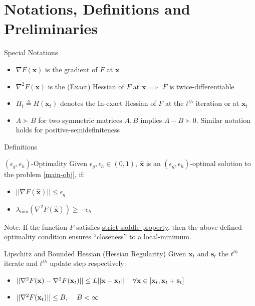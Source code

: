 \documentclass[10pt]{beamer}
\newcommand{\h}{\nabla^{2}}
\newcommand{\g}{\nabla}
\newcommand{\xbold}{\mathbf{x}}
\newcommand{\sbold}{\mathbf{s}}
\newcommand{\mineig}{\lambda_{\min}}
\begin{document}
\section{Notations, Definitions and Preliminaries}
\begin{frame}{Special Notations}
\begin{itemize}
\item<1->{\(\g F(\xbold)\) is the gradient of \(F\) at \(\xbold\)}
\item<2->{\(\h F(\xbold)\) is the (Exact) Hessian of \(F\) at \(\xbold \implies\) \(F\) is twice-differentiable}
\item<3->{\(H_{t} \triangleq H(\xbold_{t})\) denotes the In-exact Hessian of \(F\) at the \(t^{th}\) iteration or at \(\xbold_{t}\)}
\item<4->{\(A \succ B\) for two symmetric matrices \(A, B\) implies \(A - B \succ 0\). Similar notation holds for positive-semidefiniteness}
\end{itemize}
\end{frame}

\begin{frame}{Definitions}
\begin{alertblock}{\((\epsilon_{g}, \epsilon_{h})\)-Optimality}
\label{sec-opt}
Given \(\epsilon_{g}, \epsilon_{h} \in (0, 1)\), \(\mathbf{\hat{x}}\) is an \((\epsilon_{g}, \epsilon_{h})\)-optimal solution to the problem \ref{main-obj}, if:
\begin{itemize}
\item \(||\g F(\mathbf{\hat{x}}) || \leq \epsilon_{g}\)
\item \(\mineig (\h F(\mathbf{\hat{x}})) \geq -\epsilon_{h}\)
\end{itemize}
\end{alertblock}
\pause
Note: If the function \(F\) satisfies \underline{strict saddle property}, then the above defined optimality condition ensures ``closeness'' to a local-minimum. %
\pause
\begin{alertblock}{Lipschitz and Bounded Hessian (Hessian Regularity)}
Given \(\xbold_{t}\) and \(\sbold_{t}\) the \(t^{th}\) iterate and \(t^{th}\) update step respectively:
\vspace{-2mm}
\begin{itemize}
\item \(||\h F(\xbold) - \h F(\xbold_{t})|| \leq L||\xbold - \xbold_{t}|| \hspace{4mm} \forall \xbold \in [\xbold_{t}, \xbold_{t} + \sbold_{t}]\)
\item \(||\h F(\xbold_{t}) || \leq B, \hspace{4mm} B < \infty\)
\end{itemize}
\end{alertblock}
\end{frame}
\end{document}
